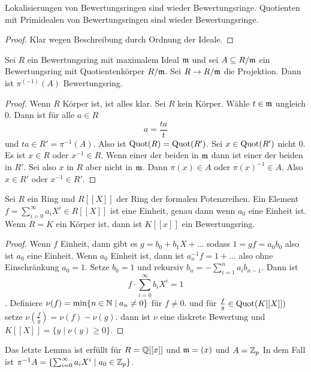 \begin{Lemma}
	Lokalisierungen von Bewertungsringen sind wieder Bewertungsringe. Quotienten mit Primidealen von Bewertungsringen
	sind wieder Bewertungsringe.
\end{Lemma}
\begin{proof}
	Klar wegen Beschreibung durch Ordnung der Ideale.
\end{proof}
\begin{Lemma}
	Sei \(R\) ein Bewertungsring mit maximalem Ideal \(\mathfrak{m}\) und sei \(A\subseteq R/\mathfrak{m}\) ein Bewertungsring
	mit Quotientenkörper \(R/\mathfrak{m}\). Sei \(R\to R/\mathfrak{m}\) die Projektion.
	Dann ist \(\pi^(-1)(A)\) Bewertungsring. 
\end{Lemma}
\begin{proof}
	
	Wenn \(R\) Körper ist, ist alles klar. Sei \(R\) kein Körper. Wähle \(t\in \mathfrak{m}\) ungleich \(0\).
	Dann ist für alle \(a\in R\) \[a=\frac{ta}{t}\] und \(ta\in R'=\pi^{-1}(A)\).
	Also ist \(\operatorname{Quot}(R)=\operatorname{Quot}(R')\).
	Sei \(x\in\operatorname{Quot}(R')\) nicht \(0\). Es ist \(x\in R\) oder \(x^{-1}\in R\).
	Wenn einer der beiden in \(\mathfrak{m}\) dann ist einer der beiden in \(R'\).
	Sei also \(x\) in \(R\) aber nicht in \(\mathfrak{m}\). Dann \(\pi(x)\in A\) oder \(\pi(x)^{-1}\in A\).
	Also \(x\in R'\) oder \(x^{-1}\in R'\).
\end{proof}

\begin{Bsp}
	Sei \(R\) ein Ring und \(R[[X]]\) der Ring der formalen Potenzreihen. Ein Element 
	\(f=\sum_{i=0}^\infty a_iX^i\in R[[X]]\) ist eine Einheit, genau dann wenn \(a_0\) eine Einheit ist. Wenn
	\(R=K\) ein Körper ist, dann ist \(K[[x]]\) ein Bewertungsring.
\end{Bsp}
\begin{proof}
	Wenn \(f\) Einheit, dann gibt es \(g=b_0+b_1X+\dots\) sodass 
	\(1=gf=a_0b_0\) also ist \(a_0\) eine Einheit.
	Wenn \(a_0\) Einheit ist, dann ist \(a_o^{-1}f=1+\dots\) also ohne Einschränkung \(a_0=1\).
	Setze \(b_0=1\) und rekursiv \(b_n=-\sum_{i=1}^na_ib_{n-1}\). Dann ist 
	\[f\cdot \sum_{i=0}^\infty b_iX^i=1\].
	Definiere \(\nu(f)=\min\{n\in\mathbb{N}\mid a_n\neq 0\}\) für \(f\neq 0\).
	und für \(\frac f g \in \operatorname{Quot}(K[[X]])\) setze \(\nu(\frac f g)=\nu(f)-\nu(g)\).
	dann ist \(\nu\) eine diskrete Bewertung und \(K[[X]]=\{ y \mid \nu(y)\geq 0\}\).
\end{proof}
\begin{Bsp}
	Das letzte Lemma ist erfüllt für \(R=\mathbb{Q}[[x]]\) und \(\mathfrak{m}=(x)\) und \(A=\mathbb{Z}_p\)
	In dem Fall ist \(\pi^{-1}A=\{\sum_{i=0}^\infty a_iX^i\mid a_0\in\mathbb{Z}_p\}\).
\end{Bsp}





